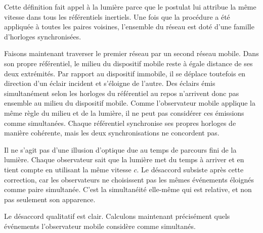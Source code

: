 Cette définition fait appel à la lumière parce que le postulat lui attribue la même vitesse dans tous les référentiels inertiels. Une fois que la procédure a été appliquée à toutes les paires voisines, l’ensemble du réseau est doté d’une famille d’horloges synchronisées.

Faisons maintenant traverser le premier réseau par un second réseau mobile. Dans son propre référentiel, le milieu du dispositif mobile reste à égale distance de ses deux extrémités. Par rapport au dispositif immobile, il se déplace toutefois en direction d’un éclair incident et s’éloigne de l’autre. Des éclairs émis simultanément selon les horloges du référentiel au repos n’arrivent donc pas ensemble au milieu du dispositif mobile. Comme l’observateur mobile applique la même règle du milieu et de la lumière, il ne peut pas considérer ces émissions comme simultanées. Chaque référentiel synchronise ses propres horloges de manière cohérente, mais les deux synchronisations ne concordent pas.

Il ne s’agit pas d’une illusion d’optique due au temps de parcours fini de la lumière. Chaque observateur sait que la lumière met du temps à arriver et en tient compte en utilisant la même vitesse \(c\). Le désaccord subsiste après cette correction, car les observateurs ne choisissent pas les mêmes événements éloignés comme paire simultanée. C’est la simultanéité elle-même qui est relative, et non pas seulement son apparence.

\begin{classroomqa}\end{classroomqa}

Le désaccord qualitatif est clair. Calculons maintenant précisément quels événements l’observateur mobile considère comme simultanés.

